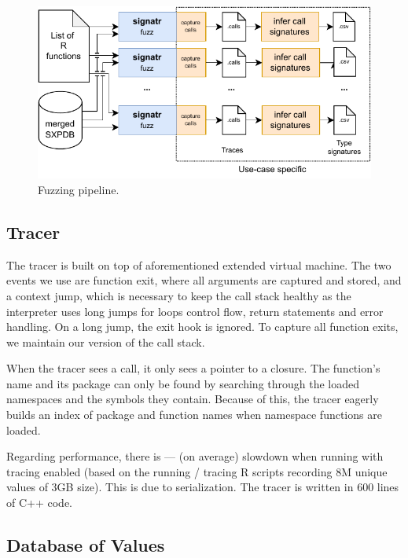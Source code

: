 \documentclass[sigplan,nonacm,anonymous,review]{acmart}
\begin{document}
\begin{figure}
    \centering
    \includegraphics[width=\columnwidth]{code-and-figures/fuzz-pipeline.pdf}
    \caption{    Fuzzing pipeline.    }\label{fig:fuzz-pipeline}
\end{figure}

\subsection{Tracer}\label{sec:argtracer}

The tracer is built on top of aforementioned extended virtual machine.
The two events we use are function exit, where all arguments are
captured and stored, and a context jump, which is necessary to keep
the call stack healthy as the interpreter uses long jumps for loops
control flow, return statements and error handling.  On a long jump,
the exit hook is ignored. To capture all function exits, we maintain
our version of the call stack.

When the tracer sees a call, it only sees a pointer to a closure.  The
function's name and its package can only be found by searching through
the loaded namespaces and the symbols they contain.  Because of this,
the tracer eagerly builds an index of package and function names when
namespace functions are loaded.

Regarding performance, there is \TRMinTracingOverhead ---
\TRMaxTracingOverhead (\TRAvgTracingOverhead on average) slowdown when
running with tracing enabled (based on the running / tracing
\TRTracingFiles R scripts recording 8M unique values of 3GB size).
This is due to serialization.  The tracer is written in 600 lines of
C++ code.

\subsection{Database of Values}\label{sec:sxpdb}
\end{document}
